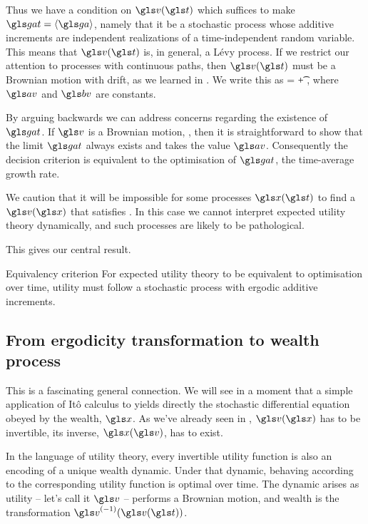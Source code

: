 \begin{itemize}
Thus we have a condition on $\gv(\t)$ which suffices to make $\gat=\ave{\gad}$, 
namely that it be a stochastic process whose additive increments are independent realizations of a time-independent random variable. This means that $\gv(\t)$ is, in general, a L\'evy process. 
If we restrict our attention to processes with 
continuous paths, then $\gv(\t)$ must be a Brownian motion with drift, as we learned in . We write this as
\be
\gd\gv = \av \gd\t + \bv \gd\gW,
\ee
where $\av$ and $\bv$ are constants.

By arguing backwards we can address concerns regarding the
existence of $\gat$. If $\gv$ is a Brownian motion, 
, then it is straightforward to show that the limit 
$\gat$ always exists and takes the value $\av$. Consequently the 
decision criterion  is equivalent to the optimisation 
of $\gat$, the time-average growth rate. 

We caution that it will be impossible for some processes $\x(\t)$ to find a $\gv(\x)$
that satisfies . 
In this case we cannot interpret expected utility theory dynamically,
and such processes are likely to be pathological. 

This gives our central result.
\begin{keypts}{Equivalency criterion}
For expected utility theory to be equivalent to 
optimisation over time, utility must follow a stochastic process 
with ergodic additive increments.
\end{keypts}

\subsection{From ergodicity transformation to wealth process}
This is a fascinating general connection. We will see in a moment that a 
simple application of It\^o calculus to  yields directly the 
stochastic differential equation obeyed by the wealth, $\x$. 
As we've already seen in , $\gv(\x)$ has 
to be invertible, \ie its inverse, $\x(\gv)$, has to exist. 


In the language of utility theory, every invertible utility 
function is also an encoding of a unique wealth dynamic. Under that dynamic, behaving according to the
corresponding utility function is optimal over time. The dynamic arises as utility -- let's call it $\gv$ -- performs a 
Brownian motion, and wealth is the transformation $\gv^{(-1)}(\gv(\t))$. 


\end{itemize}
